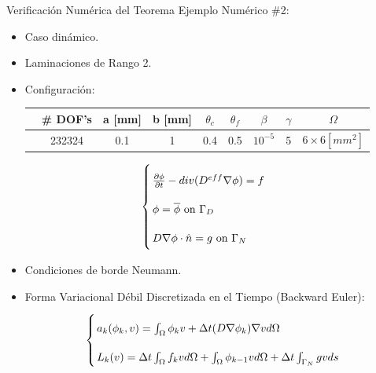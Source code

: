 \documentclass[11pt,spanish]{beamer}
\begin{document}
\begin{frame}{Verificación Numérica del Teorema}
Ejemplo Numérico \#2: 
\begin{itemize}
\item Caso dinámico.
\item Laminaciones de Rango 2.
\item Configuración:
\begin{table}[H]
\centering
\label{tab:geometric_setup_diff_r2}
\begin{tabular}{@{}ccccccccc@{}}
\toprule
       & \# DOF's & a {[}mm{]} & b {[}mm{]} & $\theta_c$ & $\theta_f$ & $\beta$   & $\gamma$ & $\Omega$ \\ \midrule
	   & 232324   & 0.1        & 1          & 0.4        & 0.5        & $10^{-5}$ & 5        & $6 \times 6 [mm^2]$ \\ \bottomrule
\end{tabular}
\end{table}
\end{itemize}
\begin{equation}
\arraycolsep=1.4pt\def\arraystretch{2.2}
\left\lbrace
\begin{array}{lr}
\frac{\partial \phi}{ \partial t} - div(D^{eff} \nabla \phi) = f \\
\phi = \overline{\phi} \text{ on } \Gamma_D \\
D \nabla \phi \cdot  \hat{n} = g \text{ on } \Gamma_N \\
\end{array}
\right.
\end{equation}
\end{frame}

\begin{frame}
\begin{itemize}
\item Condiciones de borde Neumann.
\item Forma Variacional Débil Discretizada en el Tiempo (Backward Euler):
\begin{equation*}
\arraycolsep=1.4pt\def\arraystretch{2.2}
\left\lbrace
\begin{array}{lr}
a_k(\phi_k, v) = \int_{\Omega} \phi_k v + \Delta t (D \nabla \phi_k) \nabla v  d \Omega \\
L_k(v) = \Delta t\int_{\Omega} f_k  v d \Omega + \int_{\Omega} \phi_{k-1} v d \Omega + \Delta t  \int_{\Gamma_N} g v ds
\end{array}
\right. 
\end{equation*}
\end{itemize}
\end{frame}
\end{document}
